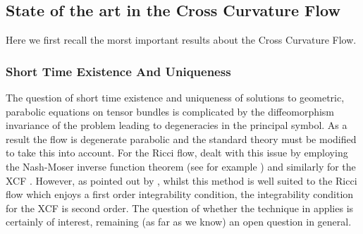 \documentclass[a4paper,12pt]{amsart}
\begin{document}
%

\subsection{State of the art in the Cross Curvature Flow}
Here we first recall the morst important results about the Cross Curvature Flow. 
\subsubsection{Short Time Existence And Uniqueness}
\label{subsec:xcf_existence_uniqueness}

The question of short time existence and uniqueness of solutions to geometric, parabolic equations on tensor bundles is complicated by the diffeomorphism invariance of the problem leading to degeneracies in the principal symbol. As a result the flow is degenerate parabolic and the standard theory must be modified to take this into account. For the Ricci flow, \cite{Hamilton:/1982} dealt with this issue by employing the Nash-Moser inverse function theorem (see for example \cite{MR656198}) and similarly for the XCF \cite{MR2055396}. However, as pointed out by \cite{MR2207496}, whilst this method is well suited to the Ricci flow which enjoys a first order integrability condition, the integrability condition for the XCF is second order. The question of whether the technique in \cite{Hamilton:/1982} applies is certainly of interest, remaining (as far as we know) an open question in general.
\end{document}
